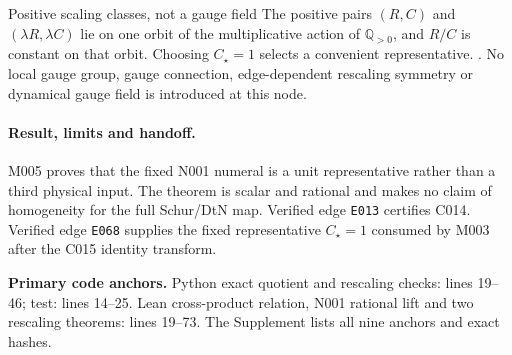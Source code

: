 \begin{cnnaInfoBox}{Positive scaling classes, not a gauge field}
The positive pairs $(R,C)$ and $(\lambda R,\lambda C)$ lie on one orbit of the
multiplicative action of $\mathbb Q_{>0}$, and $R/C$ is constant on that orbit.
Choosing $C_\star=1$ selects a convenient representative.
\cite[Sec.~I, current-balance and reduced conductance equations]{DoerflerBullo2013KronReduction}.
No local gauge
group, gauge connection, edge-dependent rescaling symmetry or dynamical gauge
field is introduced at this node.
\end{cnnaInfoBox}

\paragraph*{Result, limits and handoff.}
M005 proves that the fixed N001 numeral is a unit representative rather than a
third physical input.  The theorem is scalar and rational and makes no claim of
homogeneity for the full Schur/DtN map.  Verified edge \texttt{E013} certifies
C014.  Verified edge \texttt{E068} supplies the fixed representative
$C_\star=1$ consumed by M003 after the C015 identity transform.

\noindent\textbf{Primary code anchors.}
Python exact quotient and rescaling checks: lines 19--46; test: lines 14--25.
Lean cross-product relation, N001 rational lift and two rescaling theorems:
lines 19--73.  The Supplement lists all nine anchors and exact hashes.
